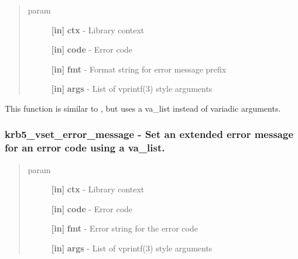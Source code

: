 \documentclass[letterpaper,10pt,english]{sphinxmanual}
\begin{document}
\begin{quote}\begin{description}
\item[{param}] \leavevmode
\textbf{{[}in{]}} \textbf{ctx} - Library context

\textbf{{[}in{]}} \textbf{code} - Error code

\textbf{{[}in{]}} \textbf{fmt} - Format string for error message prefix

\textbf{{[}in{]}} \textbf{args} - List of vprintf(3) style arguments

\end{description}\end{quote}

This function is similar to {\hyperref[appdev/refs/api/krb5_prepend_error_message:c.krb5_prepend_error_message]{}} , but uses a va\_list instead of variadic arguments.


\subsubsection{krb5\_vset\_error\_message -  Set an extended error message for an error code using a va\_list.}
\label{appdev/refs/api/krb5_vset_error_message:krb5-vset-error-message-set-an-extended-error-message-for-an-error-code-using-a-va-list}\label{appdev/refs/api/krb5_vset_error_message::doc}

\begin{fulllineitems}
\label{appdev/refs/api/krb5_vset_error_message:c.krb5_vset_error_message}
\end{fulllineitems}

\begin{quote}\begin{description}
\item[{param}] \leavevmode
\textbf{{[}in{]}} \textbf{ctx} - Library context

\textbf{{[}in{]}} \textbf{code} - Error code

\textbf{{[}in{]}} \textbf{fmt} - Error string for the error code

\textbf{{[}in{]}} \textbf{args} - List of vprintf(3) style arguments

\end{description}\end{quote}
\end{document}
